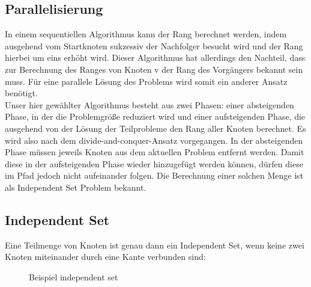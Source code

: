 \documentclass[a0,portrait]{a0poster}
\begin{document}
\begin{multicols}{2}
\subsection*{Parallelisierung}

In einem sequentiellen Algorithmus kann der Rang berechnet werden, indem ausgehend vom Startknoten
sukzessiv der Nachfolger besucht wird und der Rang hierbei um eins erhöht wird. Dieser Algorithmus 
hat allerdings den Nachteil, dass zur Berechnung des Ranges von Knoten v der Rang des Vorgängers 
bekannt sein muss. Für eine parallele Lösung des Problems wird somit ein anderer Ansatz benötigt.\\
Unser hier gewählter Algorithmus besteht aus zwei Phasen: einer absteigenden Phase, in der die 
Problemgröße reduziert wird und einer aufsteigenden Phase, die ausgehend von der Lösung der 
Teilprobleme den Rang aller Knoten berechnet. Es wird also nach dem divide-and-conquer-Ansatz 
vorgegangen. In der absteigenden Phase müssen jeweils Knoten aus dem aktuellen Problem entfernt 
werden. Damit diese in der aufsteigenden Phase wieder hinzugefügt werden können, dürfen diese im 
Pfad jedoch nicht aufeinander folgen. Die Berechnung einer solchen Menge ist als Independent Set 
Problem bekannt.

\subsection*{Independent Set}

Eine Teilmenge von Knoten ist genau dann ein Independent Set, wenn keine zwei Knoten miteinander 
durch eine Kante verbunden sind:

\begin{figure}[H]
\caption{Beispiel independent set}
\label{islist}
\end{figure}


\end{multicols}
\end{document}
